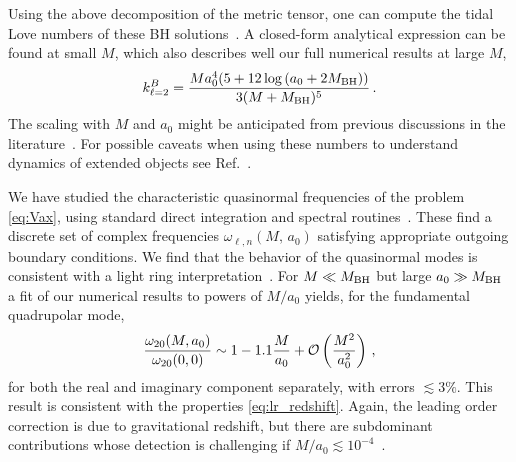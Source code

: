 \documentclass[twocolumn,preprintnumbers,nofootinbib,prd,superscriptaddress,aps]{revtex4-1}
\def\be{\begin{equation}}
\def\ee{\end{equation}}
\def\be{\begin{equation}}
\def\ee{\end{equation}}
\begin{document}
Using the above decomposition of the metric tensor, one can compute the tidal Love numbers of these BH solutions~\cite{Binnington:2009bb,Damour:2009vw,Cardoso:2017cfl}. A closed-form analytical expression can be found at small $M$, which also describes well our full numerical results at large $M$, 
%
\be
k_{\ell=2}^B=\frac{Ma_0^4(5+12\log{(a_0+2M_{\rm BH})})}{3(M+M_{\rm BH})^5}\,.
\ee
%
The scaling with $M$ and $a_0$ might be anticipated from previous discussions in the literature~\cite{Cardoso:2019upw}. For possible caveats when using these numbers to understand dynamics of extended objects see Ref.~\cite{Cardoso:2019upw}.


We have studied the characteristic quasinormal frequencies of the problem \eqref{eq:Vax}, using standard direct integration and spectral routines~\cite{Berti:2009kk,Jansen:2017oag,Cardoso:2017soq}.
These find a discrete set of complex frequencies $\omega_{\ell,n}(M,\,a_0)$ satisfying appropriate outgoing boundary conditions.
We find that the behavior of the quasinormal modes is consistent with a light ring interpretation~\cite{Cardoso:2008bp}. For $M\ll M_{\rm BH}$ but large $a_0\gg M_{\rm BH}$ a fit of our numerical results to powers of $M/a_0$ yields, for the fundamental quadrupolar mode,
%
\be
\frac{\omega_{20}(M,a_0)}{\omega_{20}(0,0)}\sim 1-1.1\frac{M}{a_0}+{\cal O}\left(\frac{M^2}{a_0^2}\right)\,,\label{eq:ringdown}
\ee
%
for both the real and imaginary component separately, with errors $\lesssim 3\%$. This result is consistent with the properties \eqref{eq:lr_redshift}.
Again, the leading order correction is due to gravitational redshift, but there are subdominant contributions whose detection is challenging if $M/a_0\lesssim 10^{-4}$~\cite{Berti:2005ys,Berti:2016lat}.
\end{document}
